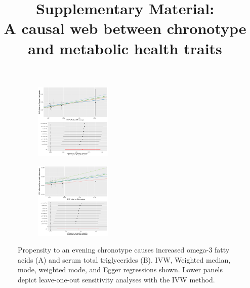 \documentclass{article}
\title{{\bf Supplementary Material:} \\A causal web between chronotype and metabolic health traits}
\author{}
\date{}
\begin{document}
\maketitle

\begin{figure}[htbp]
     \centering
     \begin{subfigure}[b]{0.4\textwidth}
         \centering
         \includegraphics[width=0.4\textwidth]{Figs/Analysis2/Chronotype_vs_Omega-3_fatty_acids.Plots.pdf}
         \label{omega3}
     \end{subfigure}
     \begin{subfigure}[b]{0.4\textwidth}
         \centering
         \includegraphics[width=0.4\textwidth]{Figs/Analysis2/Chronotype_vs_Serum_total_triglycerides.Plots.pdf}
         \label{totalTG}
     \end{subfigure}
        \caption{Propensity to an evening chronotype causes increased omega-3 fatty acids (A) and serum total triglycerides (B). IVW, Weighted median, mode, weighted mode, and Egger regressions shown. Lower panels depict leave-one-out sensitivity analyses with the IVW method.}
        \label{omega3tgs}
\end{figure}
\end{document}
